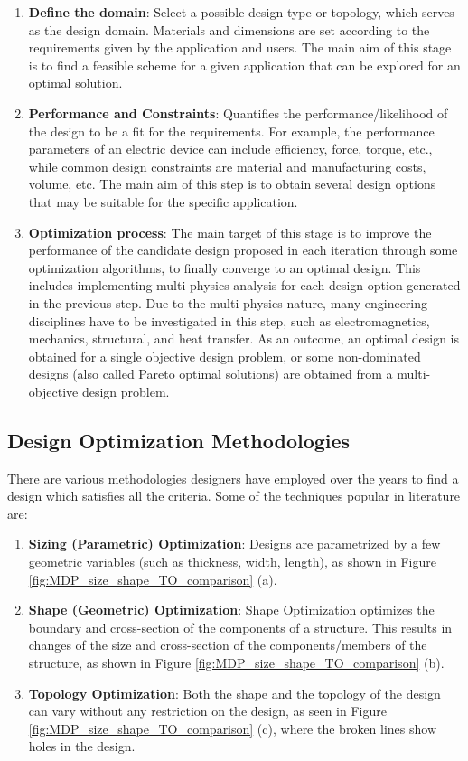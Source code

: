 \begin{enumerate}
    \item \textbf{Define the domain}: Select a possible design type or topology, which serves as the design domain. Materials and dimensions are set according to the requirements given by the application and users. The main aim of this stage is to find a feasible scheme for a given application that can be explored for an optimal solution.
    
    \item \textbf{Performance and Constraints}: Quantifies the performance/likelihood of the design to be a fit for the requirements.  For example, the performance parameters of an electric device can include efficiency, force, torque, etc., while common design constraints are material and manufacturing costs, volume, etc. The main aim of this step is to obtain several design options that may be suitable for the specific application.

    \item \textbf{Optimization process}: The main target of this stage is to improve the performance of the candidate design proposed in each iteration through some optimization algorithms, to finally converge to an optimal design. This includes implementing multi-physics analysis for each design option generated in the previous step. Due to the multi-physics nature, many engineering disciplines have to be investigated in this step, such as electromagnetics, mechanics, structural, and heat transfer. As an outcome, an optimal design is obtained for a single objective design problem, or some non-dominated designs (also called Pareto optimal solutions) are obtained from a multi-objective design problem.

\end{enumerate}

\subsection{Design Optimization Methodologies}

There are various methodologies designers have employed over the years to find a design which satisfies all the criteria. Some of the techniques popular in literature are:

\begin{enumerate}
    \item \textbf{Sizing (Parametric) Optimization}: Designs are parametrized by a few geometric variables (such as thickness, width, length), as shown in Figure \ref{fig:MDP_size_shape_TO_comparison} (a).
    \item \textbf{Shape (Geometric) Optimization}: Shape Optimization optimizes the boundary and cross-section of the components of a structure. This results in changes of the size and cross-section of the components/members of the structure, as shown in Figure \ref{fig:MDP_size_shape_TO_comparison} (b).
    \item \textbf{Topology Optimization}: Both the shape and the topology of the design can vary without any restriction on the design, as seen in Figure \ref{fig:MDP_size_shape_TO_comparison} (c), where the broken lines show holes in the design.
\end{enumerate}


